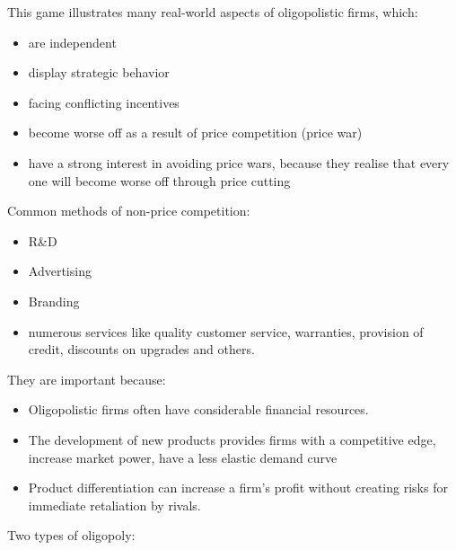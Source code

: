 \documentclass[a4paper,12pt]{article}
\begin{document}
This game illustrates many real-world aspects of oligopolistic firms, which:
\begin{itemize}
  \item are independent
  \item display strategic behavior
  \item facing conflicting incentives
  \item become worse off as a result of price competition (price war)
  \item have a strong interest in avoiding price wars, because they realise that every one will become worse off through price cutting
\end{itemize}
Common methods of non-price competition:
\begin{itemize}
  \item R\&D
  \item Advertising
  \item Branding
  \item numerous services like quality customer service, warranties, provision of credit, discounts on upgrades and others.
\end{itemize}
They are important because:
\begin{itemize}
  \item Oligopolistic firms often have considerable financial resources.
  \item The development of new products provides firms with a competitive edge, increase market power, have a less elastic demand curve
  \item Product differentiation can increase a firm's profit without creating risks for immediate retaliation by rivals.
\end{itemize}
Two types of oligopoly:
\end{document}
